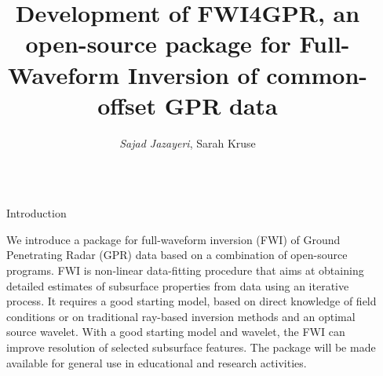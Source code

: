 \documentclass[final]{beamer}
\title{\textrm{Development of \textbf{FWI4GPR}, an open-source package for Full-Waveform Inversion of common-offset GPR data}} %
\author{\textrm{\textit{Sajad Jazayeri}, Sarah Kruse}} %
\institute{\textrm{~~School of Geosciences, University of South Florida}} %
\newlength{\sepwid}
\newlength{\onecolwid}
\begin{document}

\setlength{\belowcaptionskip}{1ex} %
\setlength\belowdisplayshortskip{2ex} %

\begin{frame}[t] %

\begin{columns}[t] %

\begin{column}{\sepwid}\end{column} %

\begin{column}{\onecolwid} %


\begin{block}{Introduction}

We introduce a package for full-waveform inversion (FWI) of Ground Penetrating Radar (GPR) data based on a
combination of open-source programs. FWI is non-linear data-fitting procedure that aims at obtaining detailed estimates of subsurface properties from data using an iterative process. It requires a good starting model, based on direct knowledge of
field conditions or on traditional ray-based inversion methods and an optimal source wavelet. With a good starting model and wavelet, the FWI can improve resolution of selected subsurface features. The package will be made available for general use in educational and research activities.

\end{block}

\vspace*{2cm}


\end{column}
\end{columns}
\end{frame}
\end{document}
